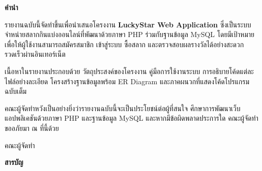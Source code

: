 \documentclass[a4paper,12pt]{article}
\begin{document}
\thispagestyle{plain}
\setcounter{page}{1}

\begin{center}
{\large\bfseries คำนำ}
\end{center}

\vspace{0.8em}
\setlength{\parindent}{2em}
\sloppy

รายงานฉบับนี้จัดทำขึ้นเพื่อนำเสนอโครงงาน \textbf{LuckyStar Web Application}
ซึ่งเป็นระบบจำหน่ายสลากกินแบ่งออนไลน์ที่พัฒนาด้วยภาษา PHP ร่วมกับฐานข้อมูล MySQL
โดยมีเป้าหมายเพื่อให้ผู้ใช้งานสามารถสมัครสมาชิก เข้าสู่ระบบ ซื้อสลาก
และตรวจสอบผลรางวัลได้อย่างสะดวกรวดเร็วผ่านอินเทอร์เน็ต

เนื้อหาในรายงานประกอบด้วย วัตถุประสงค์ของโครงงาน คู่มือการใช้งานระบบ
การอธิบายโค้ดแต่ละไฟล์อย่างละเอียด โครงสร้างฐานข้อมูลพร้อม ER Diagram
และภาคผนวกที่แสดงโค้ดโปรแกรมฉบับเต็ม

คณะผู้จัดทำหวังเป็นอย่างยิ่งว่ารายงานฉบับนี้จะเป็นประโยชน์ต่อผู้ที่สนใจ
ศึกษาการพัฒนาเว็บแอปพลิเคชันด้วยภาษา PHP และฐานข้อมูล MySQL
และหากมีข้อผิดพลาดประการใด คณะผู้จัดทำขออภัยมา ณ ที่นี้ด้วย

\setlength{\parindent}{0pt}

\vspace{2.5em}
\begin{flushright}
คณะผู้จัดทำ
\end{flushright}

\newpage

\thispagestyle{plain}
\begin{center}
{\large\bfseries สารบัญ}
\end{center}

\vspace{0.5em}
\end{document}
